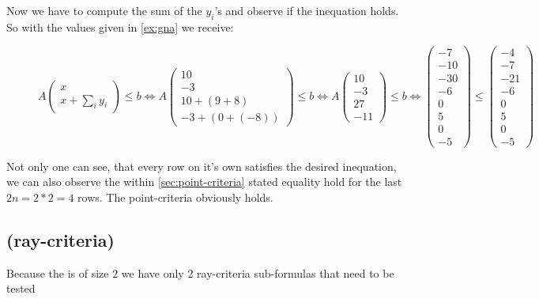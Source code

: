 	Now we have to compute the sum of the $y_i$'s and observe if the inequation holds. So with the values given in \autoref{ex:gna} we receive:
	\begin{figure}[H]
		\centering
		$A\begin{pmatrix} x \\ x + \sum_i y_i \end{pmatrix} \le b \Leftrightarrow A\begin{pmatrix} 10 \\ -3 \\ 10 + (9+8) \\ -3 + (0+(-8))\end{pmatrix} \le b \Leftrightarrow A\begin{pmatrix} 10 \\ -3 \\ 27 \\ -11 \end{pmatrix} \le b \Leftrightarrow \begin{pmatrix} -7 \\ -10 \\ -30 \\ -6 \\ 0 \\ 5 \\ 0 \\ -5 \end{pmatrix} \le \begin{pmatrix}	-4 \\ -7 \\ -21 \\ -6 \\ 0 \\ 5 \\ 0 \\ -5 \end{pmatrix}$ 
	\end{figure}
	Not only one can see, that every row on it's own satisfies the desired inequation, we can also observe the within \autoref{sec:point-criteria} stated equality hold for the last $2n=2*2=4$ rows. The point-criteria obviously holds.

	\newsavebox{\raycrit}%
	\subsection[Verifying: ray-criteria]{(ray-criteria) \usebox{\raycrit}}
	Because the \gna is of size $2$ we have only 2 ray-criteria sub-formulas that need to be tested
